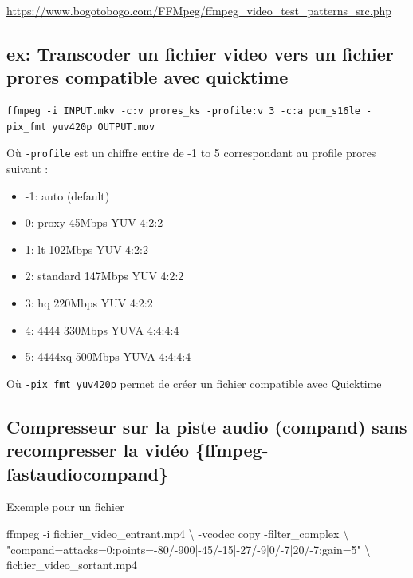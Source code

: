 \documentclass[
  french,
]{book}
\newenvironment{Shaded}{\begin{snugshade}}{\end{snugshade}}
\newcommand{\AttributeTok}[1]{\textcolor[rgb]{0.77,0.63,0.00}{#1}}
\newcommand{\DataTypeTok}[1]{\textcolor[rgb]{0.13,0.29,0.53}{#1}}
\newcommand{\ExtensionTok}[1]{#1}
\newcommand{\NormalTok}[1]{#1}
\newcommand{\StringTok}[1]{\textcolor[rgb]{0.31,0.60,0.02}{#1}}
\providecommand{\tightlist}{%
  \setlength{\itemsep}{0pt}\setlength{\parskip}{0pt}}
\begin{document}
\url{https://www.bogotobogo.com/FFMpeg/ffmpeg_video_test_patterns_src.php}

\hypertarget{ex-transcoder-un-fichier-video-vers-un-fichier-prores-compatible-avec-quicktime}{%
\subsection{ex: Transcoder un fichier video vers un fichier prores compatible avec quicktime}\label{ex-transcoder-un-fichier-video-vers-un-fichier-prores-compatible-avec-quicktime}}

\begin{verbatim}
ffmpeg -i INPUT.mkv -c:v prores_ks -profile:v 3 -c:a pcm_s16le -pix_fmt yuv420p OUTPUT.mov
\end{verbatim}

Où \texttt{-profile} est un chiffre entire de -1 to 5 correspondant au profile prores suivant :

\begin{itemize}
\tightlist
\item
  -1: auto (default)
\item
  0: proxy 45Mbps YUV 4:2:2
\item
  1: lt 102Mbps YUV 4:2:2
\item
  2: standard 147Mbps YUV 4:2:2
\item
  3: hq 220Mbps YUV 4:2:2
\item
  4: 4444 330Mbps YUVA 4:4:4:4
\item
  5: 4444xq 500Mbps YUVA 4:4:4:4
\end{itemize}

Où \texttt{-pix\_fmt\ yuv420p} permet de créer un fichier compatible avec Quicktime

\hypertarget{compresseur-sur-la-piste-audio-compand-sans-recompresser-la-viduxe9o-ffmpeg-fastaudiocompand}{%
\subsection{Compresseur sur la piste audio (compand) sans recompresser la vidéo \{ffmpeg-fastaudiocompand\}}\label{compresseur-sur-la-piste-audio-compand-sans-recompresser-la-viduxe9o-ffmpeg-fastaudiocompand}}

Exemple pour un fichier

\begin{Shaded}
\begin{Highlighting}[]
 \ExtensionTok{ffmpeg} \AttributeTok{{-}i}\NormalTok{ fichier\_video\_entrant.mp4 }\DataTypeTok{\textbackslash{}}
 \AttributeTok{{-}vcodec}\NormalTok{ copy  }\AttributeTok{{-}filter\_complex} \DataTypeTok{\textbackslash{}}
 \StringTok{"compand=attacks=0:points={-}80/{-}900|{-}45/{-}15|{-}27/{-}9|0/{-}7|20/{-}7:gain=5"} \DataTypeTok{\textbackslash{}}
\NormalTok{ fichier\_video\_sortant.mp4}
\end{Highlighting}
\end{Shaded}
\end{document}
